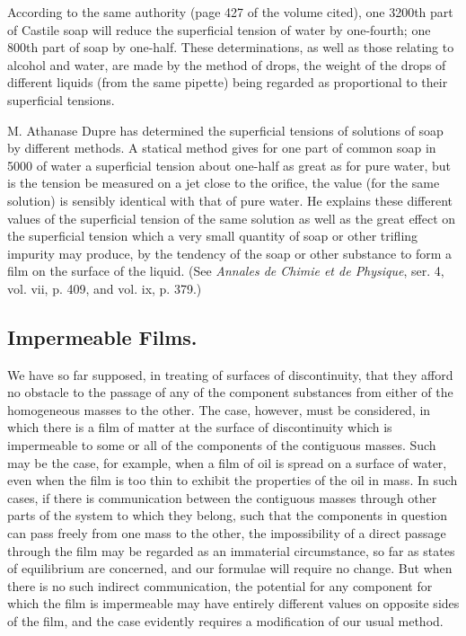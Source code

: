 \documentclass[12pt]{memoir}
\begin{document}
{According to the same authority (page 427 of the volume cited), one 3200th part of Castile soap will reduce the superficial tension of water by one-fourth; one 800th part of soap by one-half. These determinations, as well as those relating to alcohol and water, are made by the method of drops, the weight of the drops of different liquids (from the same pipette) being regarded as proportional to their superficial tensions.
 \par
M. Athanase Dupre has determined the superficial tensions of solutions of soap by different methods. A statical method gives for one part of common soap in 5000 of water a superficial tension about one-half as great as for pure water, but is the tension be measured on a jet close to the orifice, the value (for the same solution) is sensibly identical with that of pure water. He explains these different values of the superficial tension of the same solution as well as the great effect on the superficial tension which a very small quantity of soap or other trifling impurity may produce, by the tendency of the soap or other substance to form a film on the surface of the liquid. (See \textit{Annales de Chimie et de Physique}, ser. 4, vol. vii, p. 409, and vol. ix, p. 379.)}

\subsection{Impermeable Films.}
We have so far supposed, in treating of surfaces of discontinuity, that they afford no obstacle to the passage of any of the component substances from either of the homogeneous masses to the other. The case, however, must be considered, in which there is a film of matter at the surface of discontinuity which is impermeable to some or all of the components of the contiguous masses. Such may be the case, for example, when a film of oil is spread on a surface of water, even when the film is too thin to exhibit the properties of the oil in mass. In such cases, if there is communication between the contiguous masses through other parts of the system to which they belong, such that the components in question can pass freely from one mass to the other, the impossibility of a direct passage through the film may be regarded as an immaterial circumstance, so far as states of equilibrium are concerned, and our formulae will require no change. But when there is no such indirect communication, the potential for any component for which the film is impermeable may have entirely different values on opposite sides of the film, and the case evidently requires a modification of our usual method.
\end{document}
